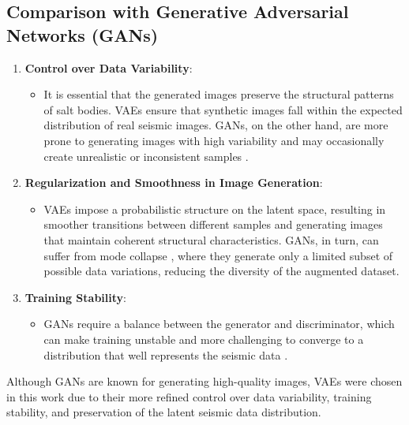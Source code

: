 \documentclass{ieeeaccess}
\begin{document}
\subsection*{Comparison with Generative Adversarial Networks (GANs)}

\begin{enumerate}
    \item \textbf{Control over Data Variability}:
    \begin{itemize}
        \item It is essential that the generated images preserve the structural patterns of salt bodies. VAEs ensure that synthetic images fall within the expected distribution of real seismic images. GANs, on the other hand, are more prone to generating images with high variability and may occasionally create unrealistic or inconsistent samples \cite{ref16}.
    \end{itemize}
    \item \textbf{Regularization and Smoothness in Image Generation}:
    \begin{itemize}
        \item VAEs impose a probabilistic structure on the latent space, resulting in smoother transitions between different samples and generating images that maintain coherent structural characteristics. GANs, in turn, can suffer from mode collapse \cite{ref16}, where they generate only a limited subset of possible data variations, reducing the diversity of the augmented dataset.
    \end{itemize}
    \item \textbf{Training Stability}:
    \begin{itemize}
        \item GANs require a balance between the generator and discriminator, which can make training unstable and more challenging to converge to a distribution that well represents the seismic data \cite{ref16}.
    \end{itemize}
\end{enumerate}

Although GANs are known for generating high-quality images, VAEs were chosen in this work due to their more refined control over data variability, training stability, and preservation of the latent seismic data distribution.
\end{document}
